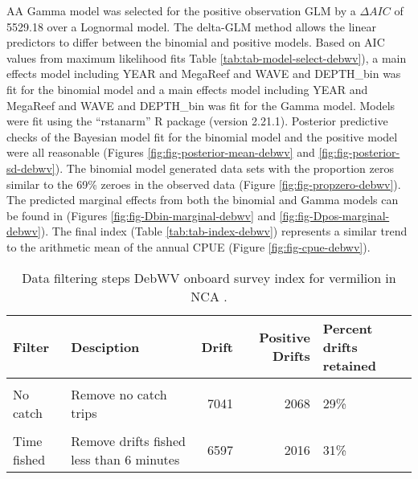 \documentclass[11pt,
  english,
  a4paper,
]{article}
\begin{document}
AA Gamma model was selected for the positive observation GLM by a {\(\Delta AIC\)\leavevmode\tagmcend\tagstructend} of 5529.18 over a Lognormal model. The delta-GLM method allows the linear predictors to differ between the binomial and positive models. Based on AIC values from maximum likelihood fits Table \ref{tab:tab-model-select-debwv}), a main effects model including YEAR and MegaReef and WAVE and DEPTH\_bin was fit for the binomial model and a main effects model including YEAR and MegaReef and WAVE and DEPTH\_bin was fit for the Gamma model. Models were fit using the ``rstanarm'' R package (version 2.21.1). Posterior predictive checks of the Bayesian model fit for the binomial model and the positive model were all reasonable (Figures \ref{fig:fig-posterior-mean-debwv} and \ref{fig:fig-posterior-sd-debwv}). The binomial model generated data sets with the proportion zeros similar to the 69\% zeroes in the observed data (Figure \ref{fig:fig-propzero-debwv}). The predicted marginal effects from both the binomial and Gamma models can be found in (Figures \ref{fig:fig-Dbin-marginal-debwv} and \ref{fig:fig-Dpos-marginal-debwv}). The final index (Table \ref{tab:tab-index-debwv}) represents a similar trend to the arithmetic mean of the annual CPUE (Figure \ref{fig:fig-cpue-debwv}).

\begin{table}

\caption{\label{tab:tab-data-filter-debwv}Data filtering steps DebWV onboard survey index for vermilion in NCA .}
\centering
\begin{tabular}[t]{llrrl}
\toprule
Filter & Desciption & Drift & Positive Drifts & Percent drifts retained\\
\midrule
\cellcolor{gray!6}{All} & \cellcolor{gray!6}{None} & \cellcolor{gray!6}{7566} & \cellcolor{gray!6}{2593} & \cellcolor{gray!6}{34\%}\\
No catch & Remove no catch trips & 7041 & 2068 & 29\%\\
\cellcolor{gray!6}{Sparse data} & \cellcolor{gray!6}{Remove District 6 and 1987} & \cellcolor{gray!6}{6697} & \cellcolor{gray!6}{2022} & \cellcolor{gray!6}{30\%}\\
Time fished & Remove drifts fished less than 6 minutes & 6597 & 2016 & 31\%\\
\bottomrule
\end{tabular}
\end{table}
\end{document}
